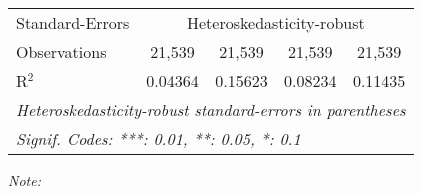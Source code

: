 \begin{table}[htbp!]
\begin{adjustbox}{width = 1\textwidth, max height = 0.95\textheight, center}
\begin{threeparttable}[b]
\begin{tabular}{lcccc}
            \midrule 
            Standard-Errors & \multicolumn{4}{c}{Heteroskedasticity-robust} \\ 
            Observations         & 21,539                         & 21,539                         & 21,539                          & 21,539\\  
            R$^2$                & 0.04364                        & 0.15623                        & 0.08234                         & 0.11435\\  
            \midrule \midrule
            \multicolumn{5}{l}{\emph{Heteroskedasticity-robust standard-errors in parentheses}}\\
            \multicolumn{5}{l}{\emph{Signif. Codes: ***: 0.01, **: 0.05, *: 0.1}}\\
         \end{tabular}
         
         \begin{tablenotes}\item \medskip \textit{Note:}
         \end{tablenotes}
      \end{threeparttable}
   \end{adjustbox}
\end{table}


